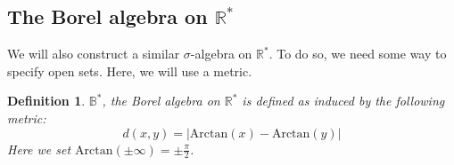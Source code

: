 \documentclass[12pt, a4paper]{article}
\newtheorem{definition}{Definition}[section]
\numberwithin{equation}{section}
\begin{document}
\subsection{The Borel algebra on $\mathbb{R}^*$}
We will also construct a similar $\sigma$-algebra on $\mathbb{R}^*$. To do so, we need some way to specify open sets. Here, we will use a metric.

\begin{definition}
$\mathbb{B}^*$, the Borel algebra on $\mathbb{R}^*$ is defined as induced by the following metric:
\begin{equation}
d(x,y)=|\textrm{Arctan}(x)-\textrm{Arctan}(y)|
\end{equation}
Here we set $\textrm{Arctan}(\pm\infty)=\pm\frac{\pi}{2}$.
\end{definition}
\end{document}
